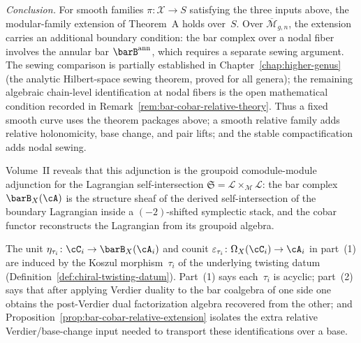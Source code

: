 \begin{remark}
\noindent
\emph{Conclusion.}
For smooth families $\pi \colon \mathcal{X} \to S$ satisfying the
three inputs above, the modular-family extension of
Theorem~\textup{A} holds over~$S$. Over
$\overline{\mathcal{M}}_{g,n}$, the extension carries an additional
boundary condition: the bar complex over a nodal fiber involves
the annular bar $\barB^{\mathrm{ann}}$, which requires a separate
sewing argument. The sewing comparison is partially established
in Chapter~\ref{chap:higher-genus} \textup{(}the analytic
Hilbert-space sewing theorem, proved for all genera\textup{)}; the
remaining algebraic chain-level identification at nodal fibers is the
open mathematical condition recorded in
Remark~\ref{rem:bar-cobar-relative-theory}. Thus a fixed smooth curve
uses the theorem packages above; a smooth relative family adds
relative holonomicity, base change, and pair lifts; and the stable
compactification adds nodal sewing.
\end{remark}

\begin{remark}
\label{rem:theorem-a-lagrangian}
Volume~II reveals that this adjunction is the groupoid
comodule-module adjunction for the Lagrangian self-intersection
$\mathfrak{S} = \mathcal{L} \times_{\mathcal{M}} \mathcal{L}$:
the bar complex $\barB_X(\cA)$ is the structure sheaf of the
derived self-intersection of the boundary Lagrangian inside a
$(-2)$-shifted symplectic stack, and the cobar functor reconstructs
the Lagrangian from its groupoid algebra.
\end{remark}

\begin{remark}
\label{rem:theorem-a-tau}
The unit $\eta_{\tau_i} \colon \cC_i \to \barB_X(\cA_i)$ and
counit $\varepsilon_{\tau_i} \colon \Omega_X(\cC_i) \to \cA_i$
in part~(1) are induced by the Koszul morphism~$\tau_i$
of the underlying twisting datum
(Definition~\ref{def:chiral-twisting-datum}).
Part~(1) says each~$\tau_i$ is acyclic;
part~(2) says that after applying Verdier duality to the bar
coalgebra of one side one obtains the post-Verdier dual factorization algebra
recovered from the other;
and Proposition~\ref{prop:bar-cobar-relative-extension} isolates
the extra relative Verdier/base-change input needed to transport
these identifications over a base.
\end{remark}

